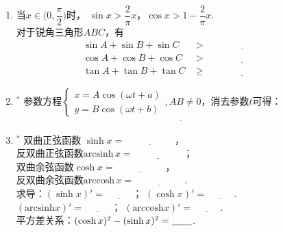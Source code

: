 \documentclass{article}
\newif\ifte
\newcommand{\e}{\mathrm{e}}
\renewcommand\geq\geqslant
\begin{document}
\begin{multicols}{2}
\begin{enumerate}[leftmargin=20pt]
\item 当$ x\in\Big(0,\dfrac{\pi}{2}\Big) $时，
$ \sin x>\dfrac{2}{\pi}x $，$ \cos x>1-\dfrac{2}{\pi}x $.\\
对于锐角三角形$ ABC $，有
\begin{align*}
    \sin A +\sin B +\sin C &>\underline{\ \ifte 
        \dfrac{2}{\pi}(A+B+C)=2 \else \hspace{3cm} \fi\ } \\
    \cos A +\cos B +\cos C &>\underline{\ \ifte 
        3-\dfrac{2}{\pi}(A+B+C)=1 \else \hspace{3cm} \fi\ } \\
    \tan A+\tan B +\tan C &\geq \underline{\ \ifte 
        3\tan\dfrac{A+B+C}{3}=3\sqrt{3} \else \hspace{3cm} \fi\ }
\end{align*}

\item $^*$ 参数方程$ \left\{ \begin{aligned}
    x=A\cos(\omega t+a) \\
    y=B\cos(\omega t+b)
\end{aligned}
\right. , AB\neq 0 $，消去参数$ t $可得：
\begin{align*}
    \underline{\ \ifte \dfrac{x^2}{A^2}+\dfrac{y^2}{B^2}-
        2\dfrac{xy}{AB}\cos(a-b)=\sin^2(a-b)\else \hspace{6cm} \fi\ }
\end{align*}

\item $^*$ 双曲正弦函数 $ \sinh x=\underline{\ \ifte 
    \dfrac{\e^x-\e^{-x}}{2}\else \hspace{2cm} \fi\ } $，\\
反双曲正弦函数$ \mathrm{arcsinh}\, x=\underline{\ \ifte \ln(x+\sqrt{x^2+1})
    \else \hspace{2cm} \fi\ } $； \\
双曲余弦函数$\cosh x=\underline{\ \ifte \dfrac{\e^x+\e^{-x}}{2}
    \else \hspace{2cm} \fi\ } $，\\
反双曲余弦函数$ \mathrm{arccosh}\, x=\underline{\ \ifte \ln(x+\sqrt{x^2-1})
    \else \hspace{2cm} \fi\ } $.\\
求导：$ (\sinh x)'=\underline{\ \ifte \cosh x\else \hspace{1cm} \fi\ } $；
$ (\cosh x)'=\underline{\ \ifte \sinh x\else \hspace{1cm} \fi\ } $. \\
$ (\mathrm{arcsinh} x)'=\underline{\ \ifte \dfrac{1}{\sqrt{x^2+1}}
    \else \hspace{1cm} \fi\ } $；
$ (\mathrm{arccosh} x)'=\underline{\ \ifte \dfrac{1}{\sqrt{x^2-1}}
    \else \hspace{1cm} \fi\ } $. \\
平方差关系：$ (\cosh x)^2-(\sinh x)^2=\underline{\ \ifte 1
    \else \hspace{0.5cm} \fi\ } $.


\end{enumerate}
\end{multicols}
\end{document}
